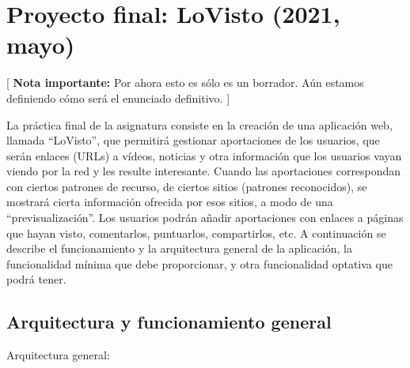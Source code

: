 \section{Proyecto final: LoVisto (2021, mayo)}
\label{practica-final-2021-05}

[ \textbf{Nota importante:} Por ahora esto es sólo es un borrador. Aún estamos definiendo cómo será el enunciado definitivo. ]

La práctica final de la asignatura consiste en la creación de una aplicación web, llamada ``LoVisto'', que permitirá gestionar aportaciones de los usuarios, que serán enlaces (URLs) a vídeos, noticias y otra información que los usuarios vayan viendo por la red y les resulte interesante. Cuando las aportaciones correspondan con ciertos patrones de recurso, de ciertos sitios (patrones reconocidos), se mostrará cierta información ofrecida por esos sitios, a modo de una ``previsualización''. Los usuarios podrán añadir aportaciones con enlaces a páginas que hayan visto, comentarlos, puntuarlos, compartirlos, etc. A continuación se describe el funcionamiento y la arquitectura general de la aplicación, la funcionalidad mínima que debe proporcionar, y otra funcionalidad optativa que podrá tener.

\subsection{Arquitectura y funcionamiento general}

Arquitectura general:

